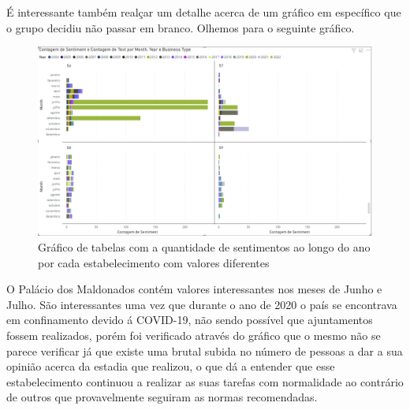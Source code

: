 É interessante também realçar um detalhe acerca de um gráfico em específico que o grupo decidiu não passar em branco. Olhemos para o seguinte gráfico.

\begin{figure}[!htb]
\centering
\includegraphics[width=16cm]{figuras/NrReviewsPerYear&BusinessType/9.PNG}
\caption{Gráfico de tabelas com a quantidade de sentimentos ao longo do ano por cada estabelecimento com valores diferentes}
\label{fig:figStrange}
\end{figure}

O Palácio dos Maldonados contém valores interessantes nos meses de Junho e Julho. São interessantes uma vez que durante o ano de 2020 o país se encontrava em confinamento devido á COVID-19, não sendo possível que ajuntamentos fossem realizados, porém foi verificado através do gráfico que o mesmo não se parece verificar já que existe uma brutal subida no número de pessoas a dar a sua opinião acerca da estadia que realizou, o que dá a entender que esse estabelecimento continuou a realizar as suas tarefas com normalidade ao contrário de outros que provavelmente seguiram as normas recomendadas.